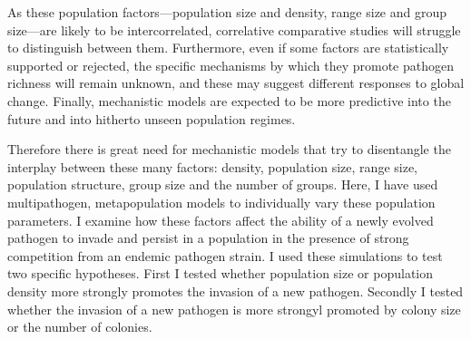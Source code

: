 As these population factors---population size and density, range size and group size---are likely to be intercorrelated, correlative comparative studies will struggle to distinguish between them.
Furthermore, even if some factors are statistically supported or rejected, the specific mechanisms by which they promote pathogen richness will remain unknown, and these may suggest different responses to global change.
Finally, mechanistic models are expected to be more predictive into the future and into hitherto unseen population regimes.







Therefore there is great need for mechanistic models that try to disentangle the interplay between these many factors: density, population size, range size, population structure, group size and the number of groups.
Here, I have used multipathogen, metapopulation models to individually vary these population parameters.
I examine how these factors affect the ability of a newly evolved pathogen to invade and persist in a population in the presence of strong competition from an endemic pathogen strain.
I used these simulations to test two specific hypotheses.
First I tested whether population size or population density more strongly promotes the invasion of a new pathogen.
Secondly I tested whether the invasion of a new pathogen is more strongyl promoted by colony size or the number of colonies.


























